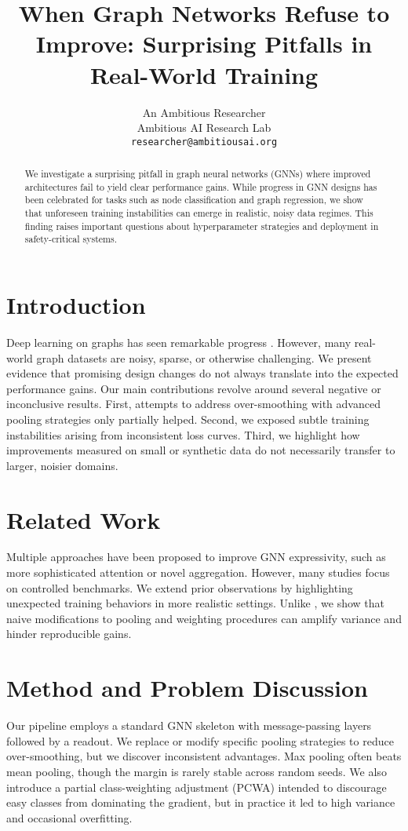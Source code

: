 \documentclass{article}
\title{When Graph Networks Refuse to Improve: Surprising Pitfalls in Real-World Training}
\author{An Ambitious Researcher \\
Ambitious AI Research Lab \\
\texttt{researcher@ambitiousai.org}
}
\begin{document}
\maketitle

\begin{abstract}
We investigate a surprising pitfall in graph neural networks (GNNs) where improved architectures fail to yield clear performance gains. While progress in GNN designs has been celebrated for tasks such as node classification and graph regression, we show that unforeseen training instabilities can emerge in realistic, noisy data regimes. This finding raises important questions about hyperparameter strategies and deployment in safety-critical systems.
\end{abstract}

\section{Introduction}
Deep learning on graphs has seen remarkable progress \citep{kipf2017semi,velickovic2018graph}. However, many real-world graph datasets are noisy, sparse, or otherwise challenging. We present evidence that promising design changes do not always translate into the expected performance gains. Our main contributions revolve around several negative or inconclusive results. First, attempts to address over-smoothing with advanced pooling strategies only partially helped. Second, we exposed subtle training instabilities arising from inconsistent loss curves. Third, we highlight how improvements measured on small or synthetic data do not necessarily transfer to larger, noisier domains.

\section{Related Work}
Multiple approaches have been proposed to improve GNN expressivity, such as more sophisticated attention \citep{velickovic2018graph} or novel aggregation. However, many studies focus on controlled benchmarks. We extend prior observations by highlighting unexpected training behaviors in more realistic settings. Unlike \citet{kipf2017semi}, we show that naive modifications to pooling and weighting procedures can amplify variance and hinder reproducible gains.

\section{Method and Problem Discussion}
Our pipeline employs a standard GNN skeleton with message-passing layers followed by a readout. We replace or modify specific pooling strategies to reduce over-smoothing, but we discover inconsistent advantages. Max pooling often beats mean pooling, though the margin is rarely stable across random seeds. We also introduce a partial class-weighting adjustment (PCWA) intended to discourage easy classes from dominating the gradient, but in practice it led to high variance and occasional overfitting.
\end{document}
